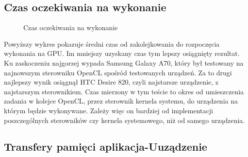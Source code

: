 \subsection[Czas oczekiwania na wykonanie]{Czas oczekiwania na wykonanie}

\begin{figure}[H]
\caption{Czas oczekiwania na wykonanie}
\end{figure}

Powyższy wykres pokazuje średni czas od zakolejkowania do rozpoczęcia wykonania na GPU. Im mniejszy uzyskany czas tym lepszy osiągnięty rezultat. Ku zaskoczeniu najgorzej wypada Samsung Galaxy A70, który był testowany na najnowszym sterowniku OpenCL spośród testowanych urządzeń. Za to drugi najlepszy wynik osiągnął HTC Desire 820, czyli najstarsze urządzenie, z najstarszym sterownikiem. Czas mierzony w tym teście to okres od umieszczenia zadania w kolejce OpenCL, przez sterownik kernela systemu, do urządzenia na którym będzie wykonywane. Zależy więc on bardziej od implementacji poszczególnych sterowników czy kernela systemowego, niż od samego urządzenia.

\subsection[Transfery pamięci aplikacja-urządzenie]{Transfery pamięci aplikacja-Uuządzenie}

